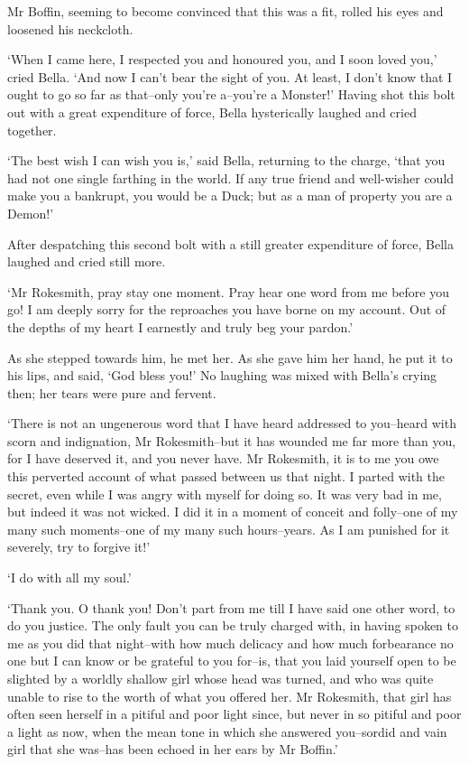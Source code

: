 Mr Boffin, seeming to become convinced that this was a fit, rolled his
eyes and loosened his neckcloth.

‘When I came here, I respected you and honoured you, and I soon loved
you,’ cried Bella. ‘And now I can’t bear the sight of you. At least, I
don’t know that I ought to go so far as that--only you’re a--you’re a
Monster!’ Having shot this bolt out with a great expenditure of force,
Bella hysterically laughed and cried together.

‘The best wish I can wish you is,’ said Bella, returning to the charge,
‘that you had not one single farthing in the world. If any true friend
and well-wisher could make you a bankrupt, you would be a Duck; but as a
man of property you are a Demon!’

After despatching this second bolt with a still greater expenditure of
force, Bella laughed and cried still more.

‘Mr Rokesmith, pray stay one moment. Pray hear one word from me before
you go! I am deeply sorry for the reproaches you have borne on my
account. Out of the depths of my heart I earnestly and truly beg your
pardon.’

As she stepped towards him, he met her. As she gave him her hand, he put
it to his lips, and said, ‘God bless you!’ No laughing was mixed with
Bella’s crying then; her tears were pure and fervent.

‘There is not an ungenerous word that I have heard addressed to
you--heard with scorn and indignation, Mr Rokesmith--but it has wounded
me far more than you, for I have deserved it, and you never have. Mr
Rokesmith, it is to me you owe this perverted account of what passed
between us that night. I parted with the secret, even while I was angry
with myself for doing so. It was very bad in me, but indeed it was not
wicked. I did it in a moment of conceit and folly--one of my many such
moments--one of my many such hours--years. As I am punished for it
severely, try to forgive it!’

‘I do with all my soul.’

‘Thank you. O thank you! Don’t part from me till I have said one other
word, to do you justice. The only fault you can be truly charged with,
in having spoken to me as you did that night--with how much delicacy
and how much forbearance no one but I can know or be grateful to you
for--is, that you laid yourself open to be slighted by a worldly shallow
girl whose head was turned, and who was quite unable to rise to the
worth of what you offered her. Mr Rokesmith, that girl has often seen
herself in a pitiful and poor light since, but never in so pitiful
and poor a light as now, when the mean tone in which she answered
you--sordid and vain girl that she was--has been echoed in her ears by
Mr Boffin.’

